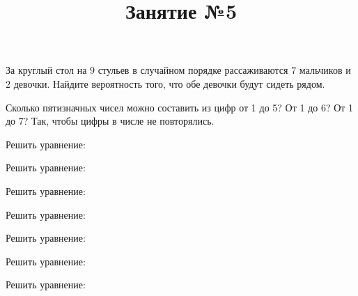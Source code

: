 \title{Занятие №5}
\begin{listofex}
	\item За круглый стол на \( 9 \) стульев в случайном порядке рассаживаются \( 7 \) мальчиков и \( 2 \) девочки. Найдите вероятность того, что обе девочки будут сидеть рядом.
	\item Сколько пятизначных чисел можно составить из цифр от 1 до 5? От 1 до 6? От 1 до 7? Так, чтобы цифры в числе не повторялись.
	\item Решить уравнение:
	\begin{enumcols}[itemcolumns=2]
		\item {}
		\item {}
		\item {}
		\item {}
	\end{enumcols}
	\item Решить уравнение:
	\begin{enumcols}[itemcolumns=3]
		\item {}
		\item {}
		\item {}
	\end{enumcols}
	\item Решить уравнение:
	\begin{enumcols}[itemcolumns=2]
		\item {}
		\item {}
	\end{enumcols}
	\item Решить уравнение:
	\begin{enumcols}[itemcolumns=3]
		\item {}
		\item {}
		\item {}
	\end{enumcols}
	\item Решить уравнение:
	\begin{enumcols}[itemcolumns=2]
		\item {}
		\item {}
	\end{enumcols}
	\item Решить уравнение:
	\begin{enumcols}[itemcolumns=3]
		\item {}
		\item {}
		\item {}
	\end{enumcols}
	\item Решить уравнение:
	\begin{enumcols}[itemcolumns=2]
		\item {}
		\item {}
	\end{enumcols}
\end{listofex}
